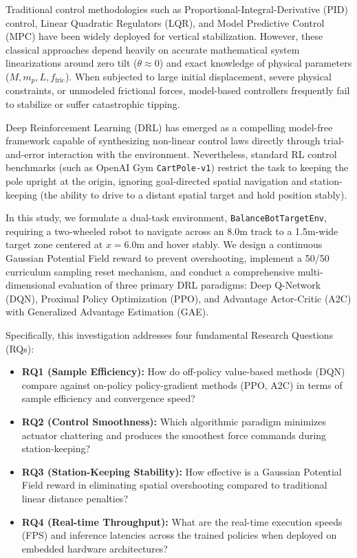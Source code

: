 \documentclass[journal,twocolumn]{IEEEtran}
\begin{document}
Traditional control methodologies such as Proportional-Integral-Derivative (PID) control, Linear Quadratic Regulators (LQR), and Model Predictive Control (MPC) have been widely deployed for vertical stabilization. However, these classical approaches depend heavily on accurate mathematical system linearizations around zero tilt ($\theta \approx 0$) and exact knowledge of physical parameters ($M, m_p, L, f_{\text{fric}}$). When subjected to large initial displacement, severe physical constraints, or unmodeled frictional forces, model-based controllers frequently fail to stabilize or suffer catastrophic tipping.

Deep Reinforcement Learning (DRL) has emerged as a compelling model-free framework capable of synthesizing non-linear control laws directly through trial-and-error interaction with the environment. Nevertheless, standard RL control benchmarks (such as OpenAI Gym \texttt{CartPole-v1}) restrict the task to keeping the pole upright at the origin, ignoring goal-directed spatial navigation and station-keeping (the ability to drive to a distant spatial target and hold position stably).

In this study, we formulate a dual-task environment, \texttt{BalanceBotTargetEnv}, requiring a two-wheeled robot to navigate across an 8.0m track to a 1.5m-wide target zone centered at $x = 6.0\text{m}$ and hover stably. We design a continuous Gaussian Potential Field reward to prevent overshooting, implement a 50/50 curriculum sampling reset mechanism, and conduct a comprehensive multi-dimensional evaluation of three primary DRL paradigms: Deep Q-Network (DQN), Proximal Policy Optimization (PPO), and Advantage Actor-Critic (A2C) with Generalized Advantage Estimation (GAE).

Specifically, this investigation addresses four fundamental Research Questions (RQs):
\begin{itemize}[leftmargin=*]
\item \textbf{RQ1 (Sample Efficiency):} How do off-policy value-based methods (DQN) compare against on-policy policy-gradient methods (PPO, A2C) in terms of sample efficiency and convergence speed?
\item \textbf{RQ2 (Control Smoothness):} Which algorithmic paradigm minimizes actuator chattering and produces the smoothest force commands during station-keeping?
\item \textbf{RQ3 (Station-Keeping Stability):} How effective is a Gaussian Potential Field reward in eliminating spatial overshooting compared to traditional linear distance penalties?
\item \textbf{RQ4 (Real-time Throughput):} What are the real-time execution speeds (FPS) and inference latencies across the trained policies when deployed on embedded hardware architectures?
\end{itemize}
\end{document}
